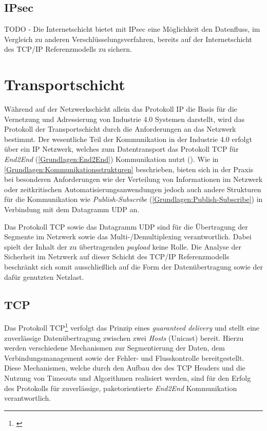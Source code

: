 \subsection{IPsec}
TODO - Die Internetschicht bietet mit IPsec eine Möglichkeit den Datenfluss, im Vergleich zu anderen Verschlüsselungsverfahren, bereits auf der Internetschicht des \ac{TCP}/\ac{IP} Referenzmodells zu sichern.

\section{Transportschicht}
\label{Analyse:Transportschicht}
Während auf der Netzwerkschicht allein das Protokoll \ac{IP} die Basis für die Vernetzung und Adressierung von Industrie 4.0 Systemen darstellt, wird das Protokoll der Transportschicht durch die Anforderungen an das Netzwerk bestimmt. Der wesentliche Teil der Kommunikation in der Industrie 4.0 erfolgt über ein \ac{IP} Netzwerk, welches zum Datentransport das Protokoll \ac{TCP} für \textit{End2End} (\autoref{Grundlagen:End2End}) Kommunikation nutzt (\cite{sichKom2017}). Wie in \autoref{Grundlagen:Kommunikationsstrukturen} beschrieben, bieten sich in der Praxis bei besonderen Anforderungen wie der Verteilung von Informationen im Netzwerk oder zeitkritischen Automatisierungsanwendungen jedoch auch andere Strukturen für die Kommunikation wie \textit{Publish-Subscribe} (\autoref{Grundlagen:Publish-Subscribe}) in Verbindung mit dem Datagramm \ac{UDP} an. 

Das Protokoll \ac{TCP} sowie das Datagramm \ac{UDP} sind für die Übertragung der Segmente im Netzwerk sowie das Multi-/Demultiplexing verantwortlich. Dabei spielt der Inhalt der zu übertragenden \textit{payload} keine Rolle. Die Analyse der Sicherheit im Netzwerk auf dieser Schicht des \ac{TCP}/\ac{IP} Referenzmodells beschränkt sich somit ausschließlich auf die Form der Datenübertragung sowie der dafür genutzten Netzlast.

\subsection{\ac{TCP}}
Das Protokoll \ac{TCP}\footnote{\cite{TCP}} verfolgt das Prinzip eines \textit{guaranteed delivery} und stellt eine zuverlässige Datenübertragung zwischen zwei \textit{Hosts} (Unicast) bereit. Hierzu werden verschiedene Mechanismen zur Segmentierung der Daten, dem Verbindungsmanagement sowie der Fehler- und Flusskontrolle bereitgestellt. Diese Mechanismen, welche durch den Aufbau des des \ac{TCP} Headers und die Nutzung von Timeouts und Algorithmen realisiert werden, sind für den Erfolg des Protokolls für zuverlässige, paketorientierte \textit{End2End} Kommunikation verantwortlich.

